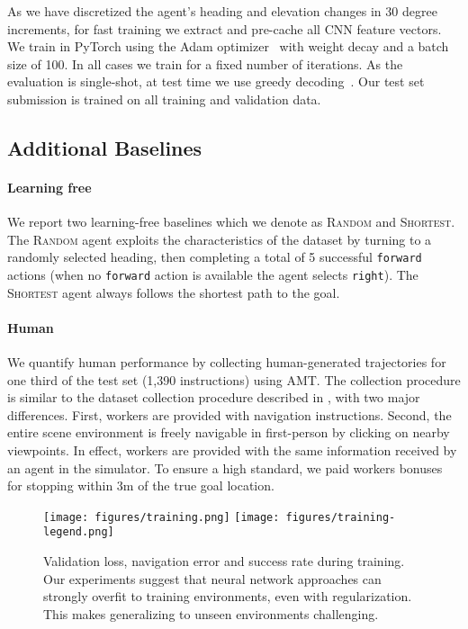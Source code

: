 \documentclass[10pt,twocolumn,letterpaper]{article}
\begin{document}
As we have discretized the agent's heading and elevation changes in 30 degree increments, for fast training we extract and pre-cache all CNN feature vectors. We train in PyTorch using the Adam optimizer~\cite{kingma2014adam} with weight decay and a batch size of 100. In all cases we train for a fixed number of iterations. As the evaluation is single-shot, at test time we use greedy decoding~\cite{scst2016}. Our test set submission is trained on all training and validation data.
 
\subsection{Additional Baselines}

\paragraph{Learning free} We report two learning-free baselines which we denote as \textsc{Random} and \textsc{Shortest}. The \textsc{Random} agent exploits the characteristics of the dataset by turning to a randomly selected heading, then completing a total of 5 successful \texttt{forward} actions (when no \texttt{forward} action is available the agent selects \texttt{right}). The \textsc{Shortest} agent always follows the shortest path to the goal.

\vspace{-0.3cm}
\paragraph{Human} We quantify human performance by collecting human-generated trajectories for one third of the test set (1,390 instructions) using AMT. The collection procedure is similar to the dataset collection procedure described in , with two major differences. First, workers are provided with navigation instructions. Second, the entire scene environment is freely navigable in first-person by clicking on nearby viewpoints. In effect, workers are provided with the same information received by an agent in the simulator. To ensure a high standard, we paid workers bonuses for stopping within 3m of the true goal location.


 

\begin{figure*}[t]
	\begin{center}
		\texttt{[image: figures/training.png]}
		\texttt{[image: figures/training-legend.png]}
	\end{center}
	\caption{Validation loss, navigation error and success rate during training. Our experiments suggest that neural network approaches can strongly overfit to training environments, even with regularization. This makes generalizing to unseen environments challenging. }
	\label{fig:training}
\end{figure*}
\end{document}
